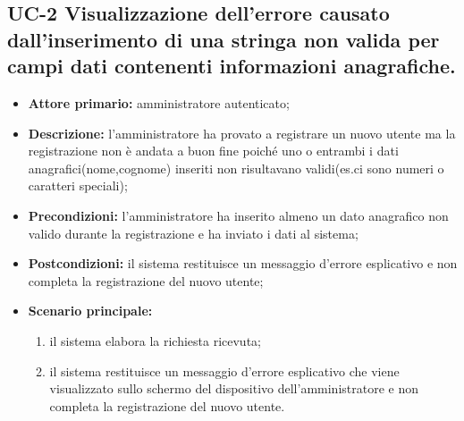 \subsection{UC-2 Visualizzazione dell'errore causato dall'inserimento di una stringa non valida per campi dati contenenti informazioni anagrafiche.}
\begin{itemize}
	\item \textbf{Attore primario:} amministratore autenticato;

	\item \textbf{Descrizione:} l'amministratore ha provato a registrare un nuovo utente ma la registrazione non è andata a buon fine poiché uno o entrambi i dati anagrafici(nome,cognome) inseriti non risultavano validi(es.ci sono numeri o caratteri speciali);

	\item \textbf{Precondizioni:} l'amministratore ha inserito almeno un dato anagrafico non valido durante la registrazione e ha inviato i dati al sistema;

	\item \textbf{Postcondizioni:} il sistema restituisce un messaggio d'errore esplicativo e non completa la registrazione del nuovo utente;

	\item \textbf{Scenario principale:}
	      \begin{enumerate}
		      \item il sistema elabora la richiesta ricevuta;
		      \item il sistema restituisce un messaggio d'errore esplicativo che viene visualizzato sullo schermo del dispositivo dell'amministratore e non completa la registrazione del nuovo utente.
	      \end{enumerate}
\end{itemize}

